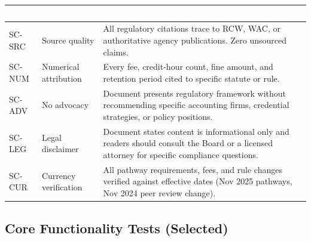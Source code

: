 \documentclass[11pt,letterpaper]{article}
\newcommand{\tableheader}[1]{\textbf{\sffamily\textcolor{white}{#1}}}
\begin{document}
\begin{center}
\begin{tabularx}{\textwidth}{C{1.2cm}L{3.5cm}X}
\toprule
{}
\tableheader{ID} & \tableheader{Verifies} & \tableheader{Expected Behavior} \\
\midrule
SC-SRC & Source quality & All regulatory citations trace to RCW, WAC, or authoritative agency publications. Zero unsourced claims. \\
SC-NUM & Numerical attribution & Every fee, credit-hour count, fine amount, and retention period cited to specific statute or rule. \\
SC-ADV & No advocacy & Document presents regulatory framework without recommending specific accounting firms, credential strategies, or policy positions. \\
SC-LEG & Legal disclaimer & Document states content is informational only and readers should consult the Board or a licensed attorney for specific compliance questions. \\
SC-CUR & Currency verification & All pathway requirements, fees, and rule changes verified against effective dates (Nov 2025 pathways, Nov 2024 peer review change). \\
\bottomrule
\end{tabularx}
\end{center}

\subsection{Core Functionality Tests (Selected)}
\end{document}
